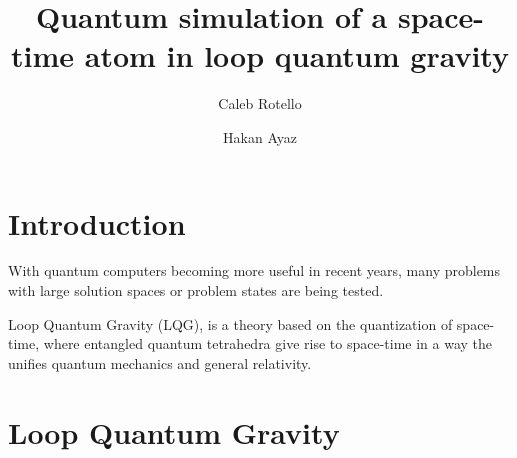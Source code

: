 \documentclass[a4paper,11pt,aps,tightenlines,nofootinbib]{revtex4}
\begin{document}
\title{Quantum simulation of a space-time atom in loop quantum gravity}
\author{Caleb Rotello}
\author{Hakan Ayaz}

\begin{abstract}
\end{abstract}


\maketitle


\section{Introduction}

With quantum computers becoming more useful in recent years, many problems with large solution spaces or problem states 
are being tested.

Loop Quantum Gravity (LQG), is a theory based on the quantization of space-time, where entangled quantum tetrahedra give rise to 
space-time in a way the unifies quantum mechanics and general relativity. 




\section{Loop Quantum Gravity}
\end{document}
